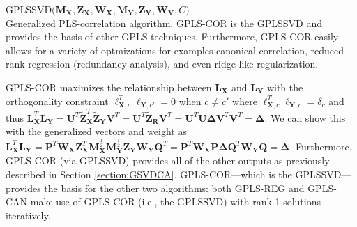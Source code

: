 \documentclass[12pt]{article}
\begin{document}
\begin{algorithm}
\DontPrintSemicolon
\SetAlgoLined
{}
\BlankLine
  $\mathrm{GPLSSVD(} {\mathbf M}_{\mathbf{X}}, {\mathbf Z}_{{\mathbf X}}, {\mathbf W}_{\mathbf{X}}, {\mathbf M}_{\mathbf{Y}}, {\mathbf Z}_{{\mathbf Y}}, {\mathbf W}_{\mathbf{Y}}, C \mathrm{)}$ \\
\caption{Generalized PLS-correlation algorithm. GPLS-COR is the GPLSSVD and provides the basis of other GPLS techniques. Furthermore, GPLS-COR easily allows for a variety of optmizations for examples canonical correlation, reduced rank regression (redundancy analysis), and even ridge-like regularization.}
\label{algo:plsc}
\end{algorithm}

GPLS-COR maximizes the relationship between \({\mathbf L}_{\mathbf X}\)
and \({\mathbf L}_{\mathbf Y}\) with the orthogonality constraint
\({\boldsymbol \ell}_{{\mathbf X},c}^{T}{\boldsymbol \ell}_{{\mathbf Y},c'} = 0\)
when \(c \neq c'\) where
\({\boldsymbol \ell}_{{\mathbf X},c}^{T}{\boldsymbol \ell}_{{\mathbf Y},c} = \delta_{c}\)
and thus
\({\mathbf L}_{\mathbf X}^{T}{\mathbf L}_{\mathbf Y} = {\mathbf U}^{T}\widetilde{\mathbf Z}_{\mathbf X}^{T}\widetilde{\mathbf Z}_{\mathbf Y}{\mathbf V}^{T} = {\mathbf U}^{T}\widetilde{\mathbf Z}_{\mathbf R}{\mathbf V}^{T} = {\mathbf U}^{T}{\mathbf U}{\boldsymbol \Delta}{\mathbf V}^{T}{\mathbf V}^{T} = {\boldsymbol \Delta}\).
We can show this with the generalized vectors and weight as
\({\mathbf L}_{\mathbf X}^{T}{\mathbf L}_{\mathbf Y} = {\mathbf P}^{T}{\mathbf W}_{\mathbf X}{\mathbf Z}_{\mathbf X}^{T}{\mathbf M}_{\mathbf X}^{\frac{1}{2}}{\mathbf M}_{\mathbf Y}^{\frac{1}{2}}{\mathbf Z}_{\mathbf Y}{\mathbf W}_{\mathbf Y}{\mathbf Q}^{T} = {\mathbf P}^{T}{\mathbf W}_{\mathbf X}{\mathbf P}{\boldsymbol \Delta}{\mathbf Q}^{T}{\mathbf W}_{\mathbf Y}{\mathbf Q} = {\boldsymbol \Delta}\).
Furthermore, GPLS-COR (via GPLSSVD) provides all of the other outputs as
previously described in Section \ref{section:GSVDCA}. GPLS-COR---which
is the GPLSSVD---provides the basis for the other two algorithms: both
GPLS-REG and GPLS-CAN make use of GPLS-COR (i.e., the GPLSSVD) with rank
1 solutions iteratively.
\end{document}
